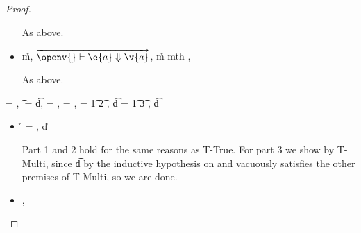 \begin{lemma}
\begin{proof}
\begin{case}[T-MethodStatic]
\begin{itemize}
\begin{subcase}[BE-Method2]
  As above.
\end{subcase}
  \item[]
\begin{subcase}[BE-Method3]
  \opsem {\openv{}}
         {}
         {\v{m}},
  $\overrightarrow{
  \opsem {\openv{}}
         {\e{a}}
         {\v{a}}
       }$,
   {\v{m}} {mth}
                    {} {}
                    {}
                    {\errorvalv{}},
  \opsem {\openv{}} {\e{}} {\errorvalv{}}

  As above.

\end{subcase}
\end{itemize}

\end{case}

\begin{case}[T-DefMulti]
  \e{} = {\createmultiexp {\s{}} {}},
  \t{} = {\MultiFntype {\s{}} {\t{d}}},
  \thenprop{\prop{}} = {\topprop{}},
  \elseprop{\prop{}} = {\botprop{}},
  \s{} = {\ArrowOne {\x{}} {\t{1}} {\t{2}}
                          {
                                      {}}
                          {}},
  \t{d} = {\ArrowOne {\x{}} {\t{1}} {\t{3}}
                          {
                                      {}}
                          {}},
  \judgementtwo {\propenv{}} { {\t{d}}}


\begin{itemize}
  \item[]
\begin{subcase}[B-DefMulti]
  \v{} = { {\emptydisptable}},
  \opsem {\openv{}} {} {\v{d}}


Part 1 and 2 hold for the same reasons as T-True.
For part 3 we show 
by T-Multi, since \judgementtwo {} { {\t{d}}} by the inductive hypothesis on {}
and {\emptydisptable} vacuously satisfies the other premises of T-Multi, so we are done.

\end{subcase}
  \item[]
\begin{subcase}[BE-DefMulti] \opsem {\openv{}} {} {\errorvalv{}},
        \opsem {\openv{}} {\e{}} {\errorvalv{}}


\end{subcase}
\end{itemize}
\end{case}
\end{proof}
\end{lemma}
